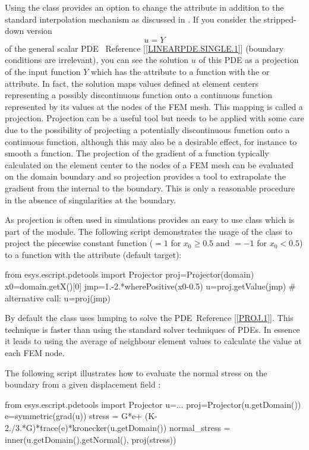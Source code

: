Using the \LinearPDE class provides an option to change the \FunctionSpace
attribute in addition to the standard interpolation mechanism
as discussed in . If you consider the stripped-down version 
\begin{equation}\label{PROJ.1}
u = Y
\end{equation}
of the general scalar PDE~ Reference [\ref{LINEARPDE.SINGLE.1}] (boundary conditions are
irrelevant), you can see the solution $u$ of this PDE as a projection of the
input function $Y$ which has the \Function attribute to a function with the
\SolutionFS or \ReducedSolutionFS attribute.
In fact, the solution maps values defined at element centers representing a
possibly discontinuous function onto a continuous function represented by its
values at the nodes of the FEM mesh.
This mapping is called a projection. Projection can be a
useful tool but needs to be applied with some care due to the possibility of
projecting a potentially discontinuous function onto a continuous function,
although this may also be a desirable effect, for instance to smooth a function.
The projection of the gradient of a function typically calculated on the
element center to the nodes of a FEM mesh can be evaluated on the domain
boundary and so projection provides a tool to extrapolate the gradient from
the internal to the boundary. This is only a reasonable procedure in the
absence of singularities at the boundary.

As projection is often used in simulations \escript provides an easy to use
class  which is part of the \pdetools module.
The following script demonstrates the usage of the class to project the
piecewise constant function ($=1$ for $x_{0}\ge 0.5$ and $=-1$ for $x_{0}<0.5$)
to a function with the \ReducedSolutionFS attribute (default target):
\begin{python}
  from esys.escript.pdetools import Projector
  proj=Projector(domain)
  x0=domain.getX()[0]
  jmp=1.-2.*wherePositive(x0-0.5)
  u=proj.getValue(jmp)
  # alternative call:
  u=proj(jmp)
\end{python}
By default the class uses lumping to solve the PDE~Reference [\ref{PROJ.1}].
This technique is faster than using the standard solver techniques of PDEs.
In essence it leads to using the average of neighbour element values to
calculate the value at each FEM node. 

The following script illustrates how to evaluate the normal stress on the
boundary from a given displacement field :
\begin{python}
  from esys.escript.pdetools import Projector
  u=...
  proj=Projector(u.getDomain())
  e=symmetric(grad(u))
  stress = G*e+ (K-2./3.*G)*trace(e)*kronecker(u.getDomain())
  normal_stress = inner(u.getDomain().getNormal(), proj(stress))
\end{python}

